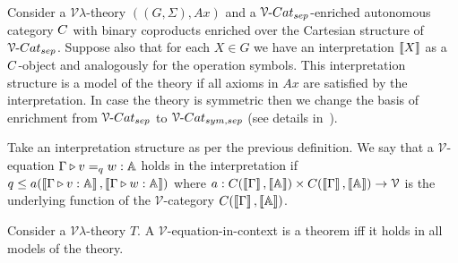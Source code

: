\documentclass[a4paper,UKenglish,cleveref, autoref, thm-restate]{lipics-v2021}
\begin{document}
\begin{definition}\label{defn:model}
        Consider a $\mathcal{V}\lambda$-theory $((G,\Sigma),Ax)$ and a
        $\VCatSe$-enriched autonomous category $\catC$ with
        binary coproducts enriched over the Cartesian structure of $\VCatSe$.
        Suppose also that for each $X \in G$ we have an interpretation
        $\left \llbracket X \right \rrbracket$ as a $\catC$-object and analogously for the operation
        symbols.  This interpretation structure is a model of the theory if all
        axioms in $Ax$ are satisfied by the interpretation. In case the theory
        is symmetric then we change the basis of enrichment from $\VCatSe$ to
        $\VCatSS$ (see details in~\cite{dahlqvist22,dahlqvist2023syntactic}).
\end{definition}
Take an interpretation structure as per the previous definition.  We say that a
$\mathcal{V}$-equation $\Gamma \triangleright v =_q w : \mathbb{A}$ holds in the
interpretation if $q \leq a(\left \llbracket \Gamma \triangleright v : \mathbb{A} \right \rrbracket, \left \llbracket \Gamma \triangleright
w : \mathbb{A} \right \rrbracket)$ where $a : \catC(\sem{\Gamma},\sem{\typeA}) \times
\catC(\sem{\Gamma},\sem{\typeA}) \to \mathcal{V}$ is the underlying function of
the $\mathcal{V}$-category $\catC(\sem{\Gamma},\sem{\typeA})$.


\begin{theorem}
        Consider a $\mathcal{V}\lambda$-theory $T$.  A
        $\mathcal{V}$-equation-in-context is a theorem iff it holds in all
        models of the theory.
\end{theorem}
\end{document}

